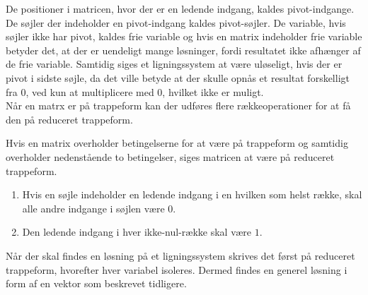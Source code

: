 De positioner i matricen, hvor der er en ledende indgang, kaldes pivot-indgange. De søjler der indeholder en pivot-indgang kaldes pivot-søjler. De variable, hvis søjler ikke har pivot, kaldes frie variable og hvis en matrix indeholder frie variable betyder det, at der er uendeligt mange løsninger, fordi resultatet ikke afhænger af de frie variable. Samtidig siges et ligningssystem at være uløseligt, hvis der er pivot i sidste søjle, da det ville betyde at der skulle opnås et resultat forskelligt fra 0, ved kun at multiplicere med 0, hvilket ikke er muligt.\\
Når en matrx er på trappeform kan der udføres flere rækkeoperationer for at få den på reduceret trappeform.

\begin{defn}
Hvis en matrix overholder betingelserne for at være på trappeform og samtidig overholder nedenstående to betingelser, siges matricen at være på reduceret trappeform.
\begin{enumerate}
\item Hvis en søjle indeholder en ledende indgang i en hvilken som helst række, skal alle andre indgange i søjlen være $0$.
\item Den ledende indgang i hver ikke-nul-række skal være $1$.
\end{enumerate}
\end{defn}

Når der skal findes en løsning på et ligningssystem skrives det først på reduceret trappeform, hvorefter hver variabel isoleres. 
Dermed findes en generel løsning i form af en vektor som beskrevet tidligere. %

